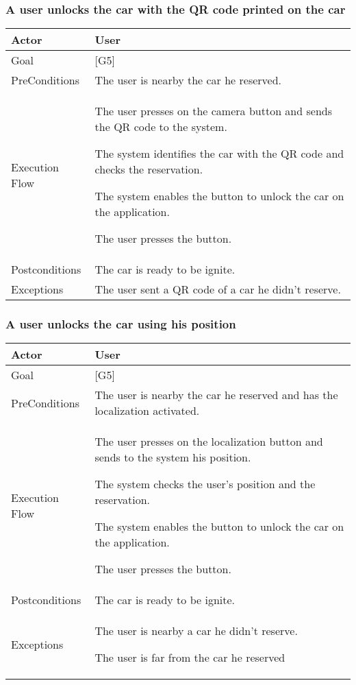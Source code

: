\documentclass{article}
\begin{document}
	\subsubsection{A user unlocks the car with the QR code printed on the car}
	\begin{tabularx}{\textwidth}{  l  X  }
		\hline
		Actor & User\\
		\hline
		Goal & [G5]\\
		\hline
		PreConditions & The user is nearby the car he reserved.\\
		\hline
		Execution Flow & \item{The user presses on the camera button and sends the QR code to the system.}
										 \item{The system identifies the car with the QR code and checks the reservation.}
										 \item{The system enables the button to unlock the car on the application.}
										 \item{The user presses the button.}\\
		\hline
		Postconditions & The car is ready to be ignite.\\
		\hline
		Exceptions & \item{The user sent a QR code of a car he didn't reserve.}\\
		\hline
	\end{tabularx}

	\subsubsection{A user unlocks the car using his position}
	\begin{tabularx}{\textwidth}{  l  X  }
		\hline
		Actor & User\\
		\hline
		Goal & [G5]\\
		\hline
		PreConditions & The user is nearby the car he reserved and has the localization activated.\\
		\hline
		Execution Flow & \item{The user presses on the localization button and sends to the system his position.}
										 \item{The system checks the user's position and the reservation.}
										 \item{The system enables the button to unlock the car on the application.}
										 \item{The user presses the button.}\\
		\hline
		Postconditions & The car is ready to be ignite.\\
		\hline
		Exceptions & \item{The user is nearby a car he didn't reserve.}
								 \item{The user is far from the car he reserved}\\
		\hline
	\end{tabularx}
\end{document}
